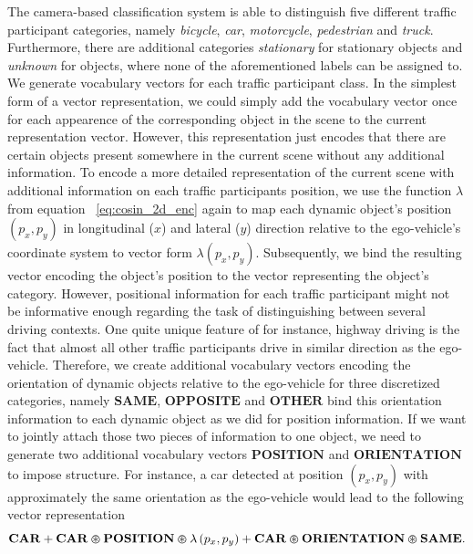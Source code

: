 The camera-based classification system is able to distinguish five different traffic participant categories, namely \emph{bicycle}, \emph{car}, \emph{motorcycle}, \emph{pedestrian} and \emph{truck}.
Furthermore, there are additional categories \emph{stationary} for stationary objects and \emph{unknown} for objects, where none of the aforementioned labels can be assigned to.
We generate vocabulary vectors for each traffic participant class.
In the simplest form of a vector representation, we could simply add the vocabulary vector once for each appearence of the corresponding object in the scene to the current representation vector. 
However, this representation just encodes that there are certain objects present somewhere in the current scene without any additional information.
To encode a more detailed representation of the current scene with additional information on each traffic participants position, we use the function $\lambda$ from equation ~\eqref{eq:cosin_2d_enc} again to map each dynamic object's position $(p_x, p_y)$ in longitudinal ($x$) and lateral ($y$) direction relative to the ego-vehicle's coordinate system to vector form $ \lambda(p_x, p_y)$.
Subsequently, we bind the resulting vector encoding the object's position to the vector representing the object's category.
However, positional information for each traffic participant might not be informative enough regarding the task of distinguishing between several driving contexts.
One quite unique feature of for instance, highway driving is the fact that almost all other traffic participants drive in similar direction as the ego-vehicle.
Therefore, we create additional vocabulary vectors encoding the orientation of dynamic objects relative to the ego-vehicle for three discretized categories, namely $\mathbf{SAME}$, $\mathbf{OPPOSITE}$ and $\mathbf{OTHER}$  bind this orientation information to each dynamic object as we did for position information.
If we want to jointly attach those two pieces of information to one object, we need to generate two additional vocabulary vectors $\mathbf{POSITION}$ and $\mathbf{ORIENTATION }$ to impose structure.
For instance, a car detected at position $\left(p_x,p_y\right)$ with approximately the same orientation as the ego-vehicle would lead to the following vector representation
\begin{equation}
\label{eq:pos_orientation_context_class}
\mathbf{CAR} + \mathbf{CAR}\varoast\mathbf{POSITION}\varoast\lambda\left(p_x,p_y\right) + \mathbf{CAR}\varoast\mathbf{ORIENTATION}\varoast\mathbf{SAME}.
\end{equation}

